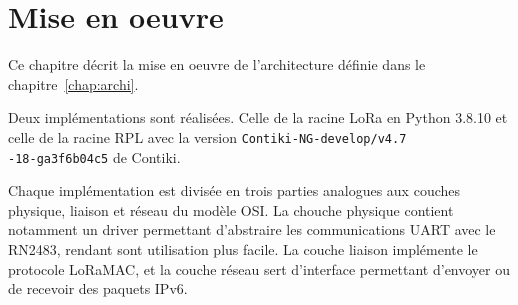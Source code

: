 \renewcommand{\leftmark}{MISE EN OEUVRE}
\chapter{Mise en oeuvre}\label{chap:work}
    Ce chapitre décrit la mise en oeuvre de l'architecture définie dans le
    chapitre~\ref{chap:archi}.

    Deux implémentations sont réalisées. Celle de la racine LoRa en Python 3.8.10 et celle de la racine RPL avec la version \texttt{Contiki-NG-develop/v4.7\\-18-ga3f6b04c5} de Contiki.

    Chaque implémentation est divisée en trois parties analogues aux couches physique, liaison et 
    réseau du modèle OSI. La chouche physique contient notamment un driver permettant d'abstraire 
    les communications UART avec le RN2483, rendant sont utilisation plus facile. La couche liaison 
    implémente le protocole LoRaMAC, et la couche réseau sert d'interface permettant d'envoyer ou 
    de recevoir des paquets IPv6.

